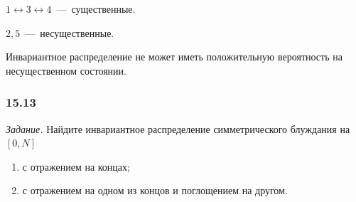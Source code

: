 $1 \leftrightarrow 3 \leftrightarrow 4$~---~существенные.

$2, 5$~---~несущественные.

Инвариантное распределение не может иметь положительную вероятность на несущественном состоянии.

\subsubsection*{15.13}

\textit{Задание.}
Найдите инвариантное распределение симметрического блуждания на $ \left[ 0, N \right] $
\begin{enumerate}[label=\alph*)]
  \item с отражением на концах;
  \item с отражением на одном из концов и поглощением на другом.
\end{enumerate}

